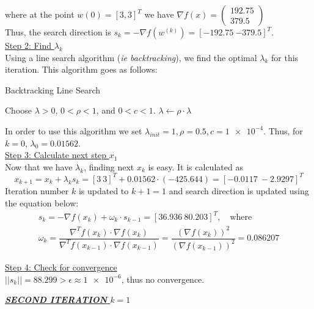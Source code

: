where at the point $w\left(0\right) = \left[3, 3\right]^T$ we have $\nabla f(x) = \left(\begin{array}{c}
	192.75 \\
	379.5
\end{array}\right)$\\
Thus, the search direction is $s_k = -\nabla f\left( w^{(k)}\right) = [\num{-192.75} \ \num{-379.5}]^T$.\\

\underline{Step 2: Find $\lambda_k$}\\
Using a line search algorithm (\textit{ie backtracking}), we find the optimal $\lambda_k$ for this iteration. This algorithm goes as follows:
\begin{algorithm}[H]
	\caption{Backtracking Line Search}
	\begin{algorithmic}
		\State Choose $\lambda > 0$, $0 < \rho < 1$, and $0 < c < 1$.
		\State $\lambda \gets \rho \cdot \lambda$
		\EndWhile
	\end{algorithmic}
\end{algorithm}
In order to use this algorithm we set $\lambda_{init} = 1, \rho=0.5, c=\num{1e-4}$.
Thus, for $k=0$, $\lambda_0 = 0.01562$.\\

\underline{Step 3: Calculate next step $x_{1}$}\\
Now that we have $\lambda_k$, finding next $x_k$ is easy. It is calculated as
\[
x_{k+1} = x_k + \lambda_k s_k = [3\ 3]^T + 0.01562 \cdot (-425.644) = [-0.0117\  -2.9297]^T
\]
Iteration number $k$ is updated to $k+1=1$ and search direction is updated using the equation below:
\[
\begin{gathered}
	s_{k} = - \nabla f(x_k) + \omega_k \cdot s_{k-1} = [36.936 \ 80.203]^T, \quad \text{where} \\ 
	\omega_k = \dfrac{\nabla^T f(x_k) \cdot \nabla f(x_k)}{\nabla^T f(x_{k-1}) \cdot \nabla f(x_{k-1})} = \dfrac{\left( \nabla f(x_k) \right)^2}{\left( \nabla f(x_{k-1}) \right)^2} =  0.086207
\end{gathered}
\]

\underline{Step 4: Check for convergence}\\[2mm]
$||s_k|| =  88.299 > \epsilon \approx \num{1e-6}$, thus no convergence.\\[3mm]

\begin{center}
	\underline{\textit{\textbf{SECOND ITERATION} $k=1$}}
\end{center}

